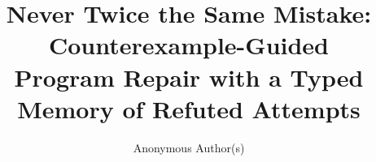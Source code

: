 \documentclass[10pt,twocolumn]{article}
\title{\bfseries\large Never Twice the Same Mistake: Counterexample-Guided\\
Program Repair with a Typed Memory of Refuted Attempts}
\author{Anonymous Author(s)}
\date{}
\theoremstyle{plain}
\theoremstyle{definition}
\theoremstyle{remark}
\begin{document}
\maketitle

\begin{abstract}

\end{abstract}










% 







\appendix

\end{document}
